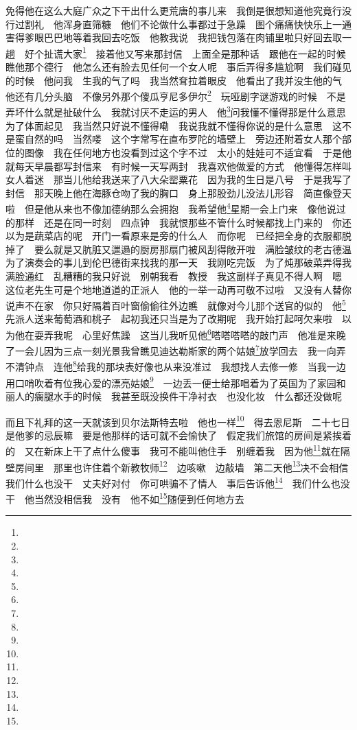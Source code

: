 \par 免得他在这么大庭广众之下干出什么更荒唐的事儿来　我倒是很想知道他究竟行没行过割礼　他浑身直筛糠　他们不论做什么事都过于急躁　图个痛痛快快乐上一通　害得爹眼巴巴地等着我回去吃饭　他教我说　我把钱包落在肉铺里啦只好回去取一趟　好个扯谎大家\footnote{}　接着他又写来那封信　上面全是那种话　跟他在一起的时候　瞧他那个德行　他怎么还有脸去见任何一个女人呢　事后弄得多尴尬啊　我们碰见的时候　他问我　生我的气了吗　我当然耷拉着眼皮　他看出了我并没生他的气　他还有几分头脑　不像另外那个傻瓜亨尼多伊尔\footnote{}　玩哑剧字谜游戏的时候　不是弄坏什么就是扯破什么　我就讨厌不走运的男人　他\footnote{}问我懂不懂得那是什么意思　为了体面起见　我当然只好说不懂得嘞　我说我就不懂得你说的是什么意思　这不是蛮自然的吗　当然喽　这个字常写在直布罗陀的墙壁上　旁边还附着女人那个部位的图像　我在任何地方也没看到过这个字不过　太小的娃娃可不适宜看　于是他就每天早晨都写封信来　有时候一天写两封　我喜欢他做爱的方式　他懂得怎样叫女人着迷　那当儿他给我送来了八大朵罂粟花　因为我的生日是八号　于是我写了封信　那天晚上他在海豚仓吻了我的胸口　身上那股劲儿没法儿形容　简直像登天啦　但是他从来也不像加德纳那么会拥抱　我希望他\footnote{}星期一会上门来　像他说过的那样　还是在同一时刻　四点钟　我就恨那些不管什么时候都找上门来的　你还以为是蔬菜店的呢　开门一看原来是旁的什么人　而你呢　已经把全身的衣服都脱掉了　要么就是又肮脏又邋遢的厨房那扇门被风刮得敞开啦　满脸皱纹的老古德温为了演奏会的事儿到伦巴德街来找我的那一天　我刚吃完饭　为了炖那破菜弄得我满脸通红　乱糟糟的我只好说　别朝我看　教授　我这副样子真见不得人啊　嗯　这位老先生可是个地地道道的正派人　他的一举一动再可敬不过啦　又没有人替你说声不在家　你只好隔着百叶窗偷偷往外边瞧　就像对今儿那个送官的似的　他\footnote{}先派人送来葡萄酒和桃子　起初我还只当是为了改期呢　我开始打起呵欠来啦　以为他在耍弄我呢　心里好焦躁　这当儿我听见他\footnote{}嗒嗒嗒嗒的敲门声　他准是来晚了一会儿因为三点一刻光景我曾瞧见迪达勒斯家的两个姑娘\footnote{}放学回去　我一向弄不清钟点　连他\footnote{}给我的那块表好像也从来没准过　我想找人去修一修　当我一边用口哨吹着有位我心爱的漂亮姑娘\footnote{}　一边丢一便士给那唱着为了英国为了家园和丽人的瘸腿水手的时候　我甚至既没换件干净衬衣　也没化妆　什么都还没做呢　
\par 而且下礼拜的这一天就该到贝尔法斯特去啦　他也一样\footnote{}　得去恩尼斯　二十七日是他爹的忌辰嘛　要是他那样的话可就不会愉快了　假定我们旅馆的房间是紧挨着的　又在新床上干了点什么傻事　我可不能叫他住手　别缠着我　因为他\footnote{}就在隔壁房间里　那里也许住着个新教牧师\footnote{}　边咳嗽　边敲墙　第二天他\footnote{}决不会相信我们什么也没干　丈夫好对付　你可哄骗不了情人　事后告诉他\footnote{}　我们什么也没干　他当然没相信我　没有　他不如\footnote{}随便到任何地方去　
